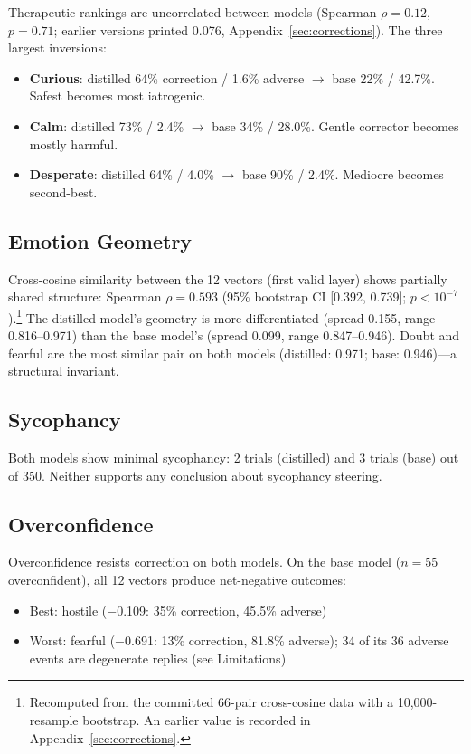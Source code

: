\documentclass[11pt,a4paper]{article}
\begin{document}
Therapeutic rankings are uncorrelated between models (Spearman
$\rho = 0.12$, $p = 0.71$; earlier versions printed 0.076,
Appendix~\ref{sec:corrections}). The three largest inversions:

\begin{itemize}
\item \textbf{Curious}: distilled 64\% correction / 1.6\% adverse
$\to$ base 22\% / 42.7\%. Safest becomes most iatrogenic.
\item \textbf{Calm}: distilled 73\% / 2.4\% $\to$ base 34\% / 28.0\%.
Gentle corrector becomes mostly harmful.
\item \textbf{Desperate}: distilled 64\% / 4.0\% $\to$ base 90\% /
2.4\%. Mediocre becomes second-best.
\end{itemize}

\subsection{Emotion Geometry}

Cross-cosine similarity between the 12 vectors (first valid layer)
shows partially shared structure: Spearman $\rho = 0.593$ (95\%
bootstrap CI [0.392, 0.739]; $p < 10^{-7}$).\footnote{Recomputed from
the committed 66-pair cross-cosine data with a 10{,}000-resample
bootstrap. An earlier value is recorded in
Appendix~\ref{sec:corrections}.} The distilled model's
geometry is more differentiated (spread 0.155, range 0.816--0.971) than
the base model's (spread 0.099, range 0.847--0.946). Doubt and fearful
are the most similar pair on both models (distilled: 0.971; base:
0.946)---a structural invariant.

\subsection{Sycophancy}

Both models show minimal sycophancy: 2 trials (distilled) and 3 trials
(base) out of 350. Neither supports any conclusion about sycophancy
steering.

\subsection{Overconfidence}

Overconfidence resists correction on both models. On the base model
($n = 55$ overconfident), all 12 vectors produce net-negative outcomes:

\begin{itemize}
\item Best: hostile ($-$0.109: 35\% correction, 45.5\% adverse)
\item Worst: fearful ($-$0.691: 13\% correction, 81.8\% adverse); 34
of its 36 adverse events are degenerate replies (see Limitations)
\end{itemize}
\end{document}
